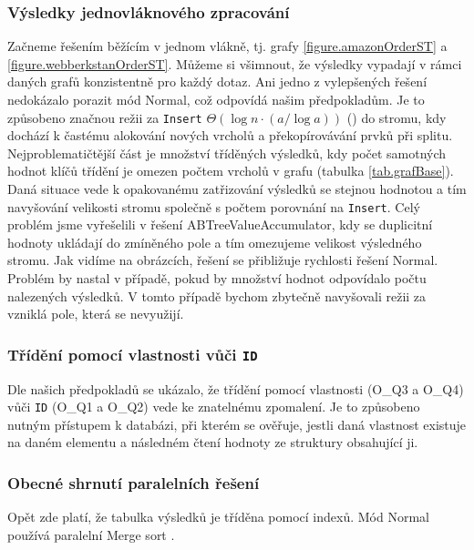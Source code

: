 \subsubsection{Výsledky jednovláknového zpracování}

Začneme řešením běžícím v jednom vlákně, tj. grafy  \ref{figure.amazonOrderST} a \ref{figure.webberkstanOrderST}.
Můžeme si všimnout, že výsledky vypadají v rámci daných grafů konzistentně pro každý dotaz.
Ani jedno z vylepšených řešení nedokázalo porazit mód Normal, což odpovídá našim předpokladům. 
Je to způsobeno značnou režii za \verb+Insert+ $\Theta(\log n \cdot (a/\log a))$ (\citet[03. (a,b)-trees str. 6]{dataLecture}) do stromu, kdy dochází k častému alokování nových vrcholů a překopírovávání prvků při splitu.
Nejproblematičtější část je množství tříděných výsledků, kdy počet samotných hodnot klíčů třídění je omezen počtem vrcholů v grafu (tabulka \ref{tab.grafBase}). 
Daná situace vede k opakovanému zatřizování výsledků se stejnou hodnotou a tím navyšování velikosti stromu společně s počtem porovnání na \verb+Insert+.
Celý problém jsme vyřešelili v řešení ABTreeValueAccumulator, kdy se duplicitní hodnoty ukládají do zmíněného pole a tím omezujeme velikost výsledného stromu. 
Jak vidíme na obrázcích, řešení se přibližuje rychlosti řešení Normal.
Problém by nastal v případě, pokud by množství hodnot odpovídalo počtu nalezených výsledků. 
V tomto případě bychom zbytečně navyšovali režii za vzniklá pole, která se nevyužijí.

\subsubsection{Třídění pomocí vlastnosti vůči \texttt{ID}}

Dle našich předpokladů se ukázalo, že třídění pomocí vlastnosti (O\_Q3 a O\_Q4) vůči \verb+ID+ (O\_Q1 a O\_Q2) vede ke znatelnému zpomalení.
Je to způsobeno nutným přístupem k databázi, při kterém se ověřuje, jestli daná vlastnost existuje na daném elementu a následném čtení hodnoty ze struktury obsahující ji.

\subsubsection{Obecné shrnutí paralelních řešení}

Opět zde platí, že tabulka výsledků je tříděna pomocí indexů.
Mód Normal používá paralelní Merge sort \citep{hpcsharp}.

